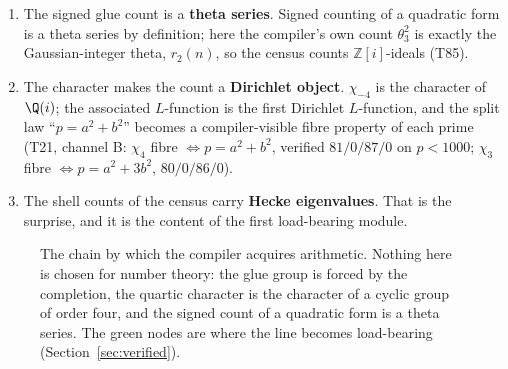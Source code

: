 \documentclass[11pt,a4paper]{article}
\newcommand{\cthree}{c_3}
\newcommand{\gcar}{g_{\mathrm{car}}}
\newcommand{\Z}{\mathbb Z}
\begin{document}
\begin{enumerate}[leftmargin=1.5em]
\item The signed glue count is a \textbf{theta series}. Signed counting of a quadratic form is a theta
series by definition; here the compiler's own count $\theta_3^2$ is exactly the Gaussian-integer theta,
$r_2(n)$, so the census counts $\Z[i]$-ideals (T85).
\item The character makes the count a \textbf{Dirichlet object}. $\chi_{-4}$ is the character of
$\Q(i)$; the associated $L$-function is the first Dirichlet $L$-function, and the split law
``$p=a^2+b^2$'' becomes a compiler-visible fibre property of each prime (T21, channel B: $\chi_4$ fibre
$\iff p=a^2+b^2$, verified $81/0/87/0$ on $p<1000$; $\chi_3$ fibre $\iff p=a^2+3b^2$, $80/0/86/0$).
\item The shell counts of the census carry \textbf{Hecke eigenvalues}. That is the surprise, and it is
the content of the first load-bearing module.
\end{enumerate}

\begin{figure}[ht]\centering
{}
\caption{The chain by which the compiler acquires arithmetic. Nothing here is chosen for number
theory: the glue group is forced by the completion, the quartic character is the character of a cyclic
group of order four, and the signed count of a quadratic form is a theta series. The green nodes are
where the line becomes load-bearing (Section~\ref{sec:verified}).}\label{fig:chain}
\end{figure}
\end{document}

